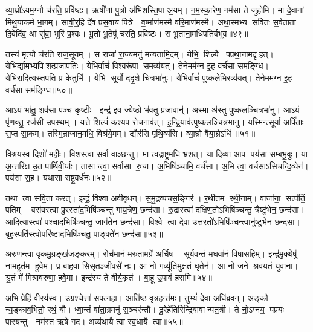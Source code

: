 व्या॒घ्रो॑ऽयम॒ग्नौ च॑रति॒ प्रवि॑ष्टः।
ऋषी॑णां पु॒त्रो अ॑भिशस्ति॒पा अ॒यम्।
न॒म॒स्का॒रेण॒ नम॑सा ते जुहोमि।
मा दे॒वानां मिथु॒याक॑र्म भा॒गम्।
सावी॒र्॒हि दे॑व प्रस॒वाय॑ पित्रे।
व॒र्ष्माण॑मस्मै वरि॒माण॑मस्मै।
अथा॒स्मभ्य सवितः स॒र्वता॑ता।
दि॒वेदि॑व॒ आ सु॑वा॒ भूरि॑ प॒श्वः।
भू॒तो भू॒तेषु॑ चरति॒ प्रवि॑ष्टः।
स भू॒ताना॒मधि॑पतिर्बभूव॥४९॥

तस्य॑ मृ॒त्यौ च॑रति राज॒सूयम्।
स राजा॑ रा॒ज्यमनु॑ मन्यतामि॒दम्।
येभि॒ शिल्पै पप्रथा॒नामदृहत्।
येभि॒र्द्याम॒भ्यपिशत्प्र॒जाप॑तिः।
येभि॒र्वाचं॑ वि॒श्वरू॑पा स॒मव्य॑यत्।
तेने॒मम॑ग्न इ॒ह वर्च॑सा॒ सम॑ङ्ग्धि।
येभि॑रादि॒त्यस्तप॑ति॒ प्र के॒तुभि॑।
येभि॒ सूर्यो॑ ददृ॒शे चि॒त्रभा॑नुः।
येभि॒र्वाचं॑ पुष्क॒लेभि॒रव्य॑यत्।
तेने॒मम॑ग्न इ॒ह वर्च॑सा॒ सम॑ङ्ग्धि॥५०॥

आऽयं भा॑तु॒ शव॑सा॒ पञ्च॑ कृ॒ष्टीः।
इन्द्र॑ इव ज्ये॒ष्ठो भ॑वतु प्र॒जावान्॑।
अ॒स्मा अ॑स्तु पुष्क॒लञ्चि॒त्रभा॑नु।
आऽयं पृ॑णक्तु॒ रज॑सी उ॒पस्थम्।
यत्ते॒ शिल्पं॑ कश्यप रोच॒नाव॑त्।
इ॒न्द्रि॒याव॑त्पुष्क॒लञ्चि॒त्रभा॑नु।
यस्मि॒न्त्सूर्या॒ अर्पि॑ताः स॒प्त सा॒कम्।
तस्मि॒न्राजा॑न॒मधि॒ विश्र॑ये॒मम्।
द्यौर॑सि पृथि॒व्य॑सि।
व्या॒घ्रो वैया॒घ्रेऽधि॑ ॥५१॥

विश्र॑यस्व॒ दिशो॑ म॒हीः।
विश॑स्त्वा॒ सर्वा॑ वाञ्छन्तु।
मा त्वद्रा॒ष्ट्रमधि॑ भ्रशत्।
या दि॒व्या आप॒ पय॑सा सम्बभू॒वुः।
या अ॒न्तरि॑क्ष उ॒त पार्थि॑वी॒र्याः।
तासान्त्वा॒ सर्वा॑सा रु॒चा।
अ॒भिषि॑ञ्चामि॒ वर्च॑सा।
अ॒भि त्वा॒ वर्च॑साऽसिचन्दि॒व्येन॑।
पय॑सा स॒ह।
यथासा॑ राष्ट्र॒वर्ध॑नः॥५२॥

तथा त्वा सवि॒ता क॑रत्।
इन्द्रं॒ विश्वा॑ अवीवृधन्।
स॒मु॒द्रव्य॑चस॒ङ्गिर॑।
र॒थीत॑म रथी॒नाम्।
वाजा॑ना॒ सत्प॑तिं॒ पतिम्।
वस॑वस्त्वा पु॒रस्ता॑द॒भिषि॑ञ्चन्तु गाय॒त्रेण॒ छन्द॑सा।
रु॒द्रास्त्वा॑ दक्षिण॒तो॑ऽभिषि॑ञ्चन्तु॒ त्रैष्टु॑भेन॒ छन्द॑सा।
आ॒दि॒त्यास्त्वा॑ प॒श्चाद॒भिषि॑ञ्चन्तु॒ जाग॑तेन॒ छन्द॑सा।
विश्वे त्वा दे॒वा उ॑त्तर॒तो॑ऽभिषि॑ञ्च॒न्त्वानु॑ष्टुभेन॒ छन्द॑सा।
बृह॒स्पति॑स्त्वो॒परि॑ष्टाद॒भिषि॑ञ्चतु॒ पाङ्क्ते॑न॒ छन्द॑सा॥५३॥

अ॒रु॒णन्त्वा॒ वृक॑मु॒ग्रङ्ख॑जङ्क॒रम्।
रोच॑मानं म॒रुता॒मग्रे॑ अ॒र्चिष॑।
सूर्य॑वन्तं म॒घवा॑नं विषास॒हिम्।
इन्द्र॑मु॒क्थेषु॑ नाम॒हूत॑म हुवेम।
प्र बा॒हवा॑ सिसृतञ्जी॒वसे॑ नः।
आ नो॒ गव्यू॑तिमुक्षतं घृ॒तेन॑।
आ नो॒ जने श्रवयतं युवाना।
श्रु॒तं मे॑ मित्रावरुणा॒ हवे॒मा।
इन्द्र॑स्य ते वीर्य॒कृत॑।
बा॒हू उ॒पाव॑ हरामि॥५४॥\anuvakamend[ब॒भू॒वाव्य॑य॒त्तेने॒मम॑ग्न इ॒ह वर्च॑सा॒ सम॑ङ्ग्धि॒ वैया॒घ्रेऽधि॑ राष्ट्र॒वर्ध॑न॒ पाङ्क्ते॑न॒ छन्द॑सो॒पाव॑हरामि]

अ॒भि प्रेहि॑ वी॒रय॑स्व।
उ॒ग्रश्चेत्ता॑ सपत्न॒हा।
आति॑ष्ठ वृत्र॒हन्त॑मः।
तुभ्यं॑ दे॒वा अधि॑ब्रवन्।
अ॒ङ्कौ न्य॒ङ्काव॒भितो॒ रथं॒ यौ।
ध्वा॒न्तं वा॑ता॒ग्रमनु॑ स॒ञ्चर॑न्तौ।
दू॒रेहे॑तिरिन्द्रि॒यावान्पत॒त्री।
ते नो॒ऽग्नय॒ पप्र॑यः पारयन्तु।
नम॑स्त ऋषे गद।
अव्य॑थायै त्वा स्व॒धायै त्वा॥५५॥

